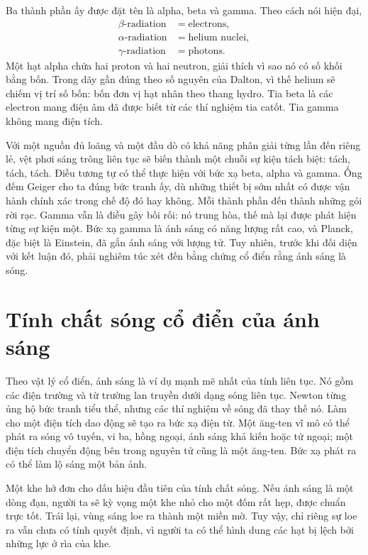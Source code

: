 Ba thành phần ấy được đặt tên là alpha, beta và gamma. Theo cách nói hiện đại,
\begin{equation}
\begin{aligned}
\beta\text{-radiation} &= \text{electrons},\\
\alpha\text{-radiation} &= \text{helium nuclei},\\
\gamma\text{-radiation} &= \text{photons}.
\end{aligned}
\end{equation}
Một hạt alpha chứa hai proton và hai neutron, giải thích vì sao nó có số khối bằng bốn. Trong dãy gần đúng theo số nguyên của Dalton, vì thế helium sẽ chiếm vị trí số bốn: bốn đơn vị hạt nhân theo thang hydro. Tia beta là các electron mang điện âm đã được biết từ các thí nghiệm tia catốt. Tia gamma không mang điện tích.

Với một nguồn đủ loãng và một đầu dò có khả năng phân giải từng lần đến riêng lẻ, vệt phơi sáng trông liên tục sẽ biến thành một chuỗi sự kiện tách biệt: tách, tách, tách. Điều tương tự có thể thực hiện với bức xạ beta, alpha và gamma. Ống đếm Geiger cho ta đúng bức tranh ấy, dù những thiết bị sớm nhất có được vận hành chính xác trong chế độ đó hay không. Mỗi thành phần đến thành những gói rời rạc. Gamma vẫn là điều gây bối rối: nó trung hòa, thế mà lại được phát hiện từng sự kiện một. Bức xạ gamma là ánh sáng có năng lượng rất cao, và Planck, đặc biệt là Einstein, đã gắn ánh sáng với lượng tử. Tuy nhiên, trước khi đối diện với kết luận đó, phải nghiêm túc xét đến bằng chứng cổ điển rằng ánh sáng là sóng.

\section{Tính chất sóng cổ điển của ánh sáng}

Theo vật lý cổ điển, ánh sáng là ví dụ mạnh mẽ nhất của tính liên tục. Nó gồm các điện trường và từ trường lan truyền dưới dạng sóng liên tục. Newton từng ủng hộ bức tranh tiểu thể, nhưng các thí nghiệm về sóng đã thay thế nó. Làm cho một điện tích dao động sẽ tạo ra bức xạ điện từ. Một ăng-ten vĩ mô có thể phát ra sóng vô tuyến, vi ba, hồng ngoại, ánh sáng khả kiến hoặc tử ngoại; một điện tích chuyển động bên trong nguyên tử cũng là một ăng-ten. Bức xạ phát ra có thể làm lộ sáng một bản ảnh.

Một khe hở đơn cho dấu hiệu đầu tiên của tính chất sóng. Nếu ánh sáng là một dòng đạn, người ta sẽ kỳ vọng một khe nhỏ cho một đốm rất hẹp, được chuẩn trực tốt. Trái lại, vùng sáng loe ra thành một miền mờ. Tuy vậy, chỉ riêng sự loe ra vẫn chưa có tính quyết định, vì người ta có thể hình dung các hạt bị lệch bởi những lực ở rìa của khe.


